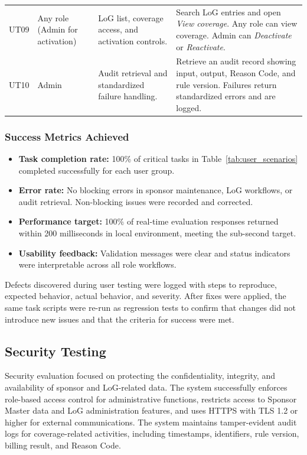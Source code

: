 \begin{table}[htbp]
\begin{tabularx}{\linewidth}{@{}
  >{\RaggedRight\arraybackslash}p{1.1cm}
  >{\RaggedRight\arraybackslash}p{2.9cm}
  Y
  Y
@{}}
UT09 & Any role (Admin for activation) &
LoG list, coverage access, and activation controls. &
Search LoG entries and open \emph{View coverage}. Any role can view coverage. Admin can \emph{Deactivate} or \emph{Reactivate}. \\

UT10 & Admin &
Audit retrieval and standardized failure handling. &
Retrieve an audit record showing input, output, Reason Code, and rule version. Failures return standardized errors and are logged. \\
\bottomrule
\end{tabularx}
\end{table}

\subsubsection*{Success Metrics Achieved}

\begin{itemize}
  \item \textbf{Task completion rate:} 100\% of critical tasks in Table~\ref{tab:user_scenarios} completed successfully for each user group.
  \item \textbf{Error rate:} No blocking errors in sponsor maintenance, LoG workflows, or audit retrieval. Non-blocking issues were recorded and corrected.
  \item \textbf{Performance target:} 100\% of real-time evaluation responses returned within 200 milliseconds in local environment, meeting the sub-second target.
  \item \textbf{Usability feedback:} Validation messages were clear and status indicators were interpretable across all role workflows.
\end{itemize}

Defects discovered during user testing were logged with steps to reproduce, expected behavior, actual behavior, and severity. After fixes were applied, the same task scripts were re-run as regression tests to confirm that changes did not introduce new issues and that the criteria for success were met.

\subsection{Security Testing}

Security evaluation focused on protecting the confidentiality, integrity, and availability of sponsor and LoG-related data. The system successfully enforces role-based access control for administrative functions, restricts access to Sponsor Master data and LoG administration features, and uses HTTPS with TLS 1.2 or higher for external communications. The system maintains tamper-evident audit logs for coverage-related activities, including timestamps, identifiers, rule version, billing result, and Reason Code.

